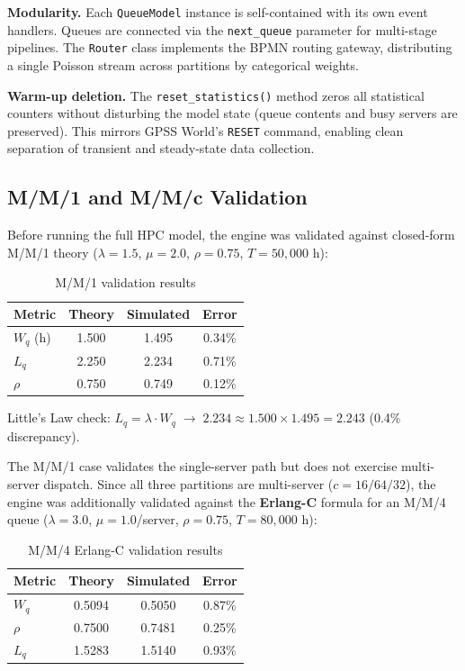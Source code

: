 \documentclass[11pt,a4paper]{article}
\newcommand{\Wq}{\ensuremath{W_q}}
\newcommand{\Lq}{\ensuremath{L_q}}
\newcommand{\lam}{\ensuremath{\lambda}}
\newcommand{\murate}{\ensuremath{\mu}}
\begin{document}
\textbf{Modularity.} Each \texttt{QueueModel} instance is self-contained with its own event handlers.
Queues are connected via the \texttt{next\_queue} parameter for multi-stage pipelines. The \texttt{Router}
class implements the BPMN routing gateway, distributing a single Poisson stream across partitions by
categorical weights.

\textbf{Warm-up deletion.} The \texttt{reset\_statistics()} method zeros all statistical counters without
disturbing the model state (queue contents and busy servers are preserved). This mirrors GPSS World's
\texttt{RESET} command, enabling clean separation of transient and steady-state data collection.

\subsection{M/M/1 and M/M/c Validation}

Before running the full HPC model, the engine was validated against closed-form M/M/1 theory
($\lam=1.5$, $\murate=2.0$, $\rho=0.75$, $T=50{,}000$ h):

\begin{table}[H]
\centering
\caption{M/M/1 validation results}
\begin{tabular}{lccc}
\toprule
\textbf{Metric} & \textbf{Theory} & \textbf{Simulated} & \textbf{Error} \\
\midrule
$\Wq$ (h) & 1.500 & 1.495 & 0.34\% \\
$\Lq$     & 2.250 & 2.234 & 0.71\% \\
$\rho$    & 0.750 & 0.749 & 0.12\% \\
\bottomrule
\end{tabular}
\end{table}

Little's Law check: $\Lq = \lam \cdot \Wq \;\to\; 2.234 \approx 1.500 \times 1.495 = 2.243$ \checkmark
(0.4\% discrepancy).

The M/M/1 case validates the single-server path but does not exercise multi-server dispatch. Since all
three partitions are multi-server ($c = 16/64/32$), the engine was additionally validated against the
\textbf{Erlang-C} formula for an M/M/4 queue ($\lam=3.0$, $\murate=1.0$/server, $\rho=0.75$,
$T=80{,}000$ h):

\begin{table}[H]
\centering
\caption{M/M/4 Erlang-C validation results}
\begin{tabular}{lccc}
\toprule
\textbf{Metric} & \textbf{Theory} & \textbf{Simulated} & \textbf{Error} \\
\midrule
$\Wq$  & 0.5094 & 0.5050 & 0.87\% \\
$\rho$ & 0.7500 & 0.7481 & 0.25\% \\
$\Lq$  & 1.5283 & 1.5140 & 0.93\% \\
\bottomrule
\end{tabular}
\end{table}
\end{document}
